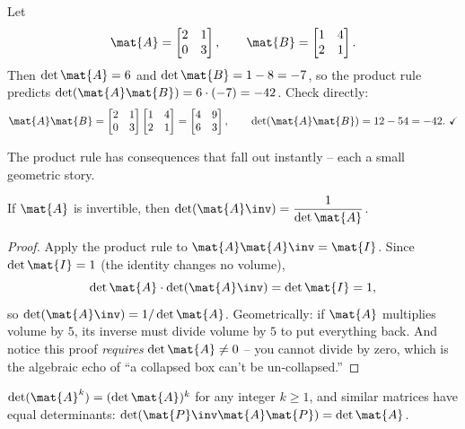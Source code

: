 \begin{example}
\label{ch21:ex-product}
Let
\[
  \mat{A} = \begin{bmatrix} 2 & 1 \\ 0 & 3 \end{bmatrix},\qquad
  \mat{B} = \begin{bmatrix} 1 & 4 \\ 2 & 1 \end{bmatrix}.
\]
Then $\det\mat{A} = 6$ and $\det\mat{B} = 1 - 8 = -7$, so the product rule
predicts $\det(\mat{A}\mat{B}) = 6\cdot(-7) = -42$. Check directly:
\[
  \mat{A}\mat{B}
  = \begin{bmatrix} 2 & 1 \\ 0 & 3 \end{bmatrix}\begin{bmatrix} 1 & 4 \\ 2 & 1 \end{bmatrix}
  = \begin{bmatrix} 4 & 9 \\ 6 & 3 \end{bmatrix},
  \qquad
  \det(\mat{A}\mat{B}) = 12 - 54 = -42.\ \checkmark
\]
\end{example}

The product rule has consequences that fall out instantly -- each a small
geometric story.

\begin{corollary}
\label{ch21:cor-inverse}
If $\mat{A}$ is invertible, then $\det(\mat{A}\inv) = \dfrac{1}{\det\mat{A}}$.
\end{corollary}

\begin{proof}
Apply the product rule to $\mat{A}\mat{A}\inv = \mat{I}$. Since $\det\mat{I} = 1$
(the identity changes no volume),
\[
  \det\mat{A}\cdot\det(\mat{A}\inv) = \det\mat{I} = 1,
\]
so $\det(\mat{A}\inv) = 1/\det\mat{A}$. Geometrically: if $\mat{A}$ multiplies
volume by $5$, its inverse must divide volume by $5$ to put everything back. And
notice this proof \emph{requires} $\det\mat{A}\neq 0$ -- you cannot divide by
zero, which is the algebraic echo of ``a collapsed box can't be un-collapsed.''
\end{proof}

\begin{corollary}
\label{ch21:cor-powers}
$\det(\mat{A}^k) = (\det\mat{A})^k$ for any integer $k\ge 1$, and similar matrices
have equal determinants: $\det(\mat{P}\inv\mat{A}\mat{P}) = \det\mat{A}$.
\end{corollary}

